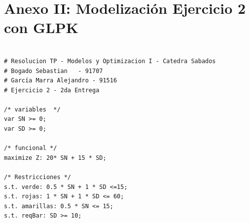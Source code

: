 \documentclass[a4paper,10pt]{article}
\begin{document}
 \newpage

\section{Anexo II: Modelizaci\'on Ejercicio 2 con GLPK}

 \begin{verbatim}

# Resolucion TP - Modelos y Optimizacion I - Catedra Sabados
# Bogado Sebastian 	 - 91707
# García Marra Alejandro - 91516
# Ejercicio 2 - 2da Entrega

/* variables  */
var SN >= 0;
var SD >= 0;

/* funcional */
maximize Z: 20* SN + 15 * SD;  

/* Restricciones */
s.t. verde: 0.5 * SN + 1 * SD <=15;
s.t. rojas: 1 * SN + 1 * SD <= 60;
s.t. amarillas: 0.5 * SN <= 15;
s.t. reqBar: SD >= 10;

 \end{verbatim}
\end{document}
